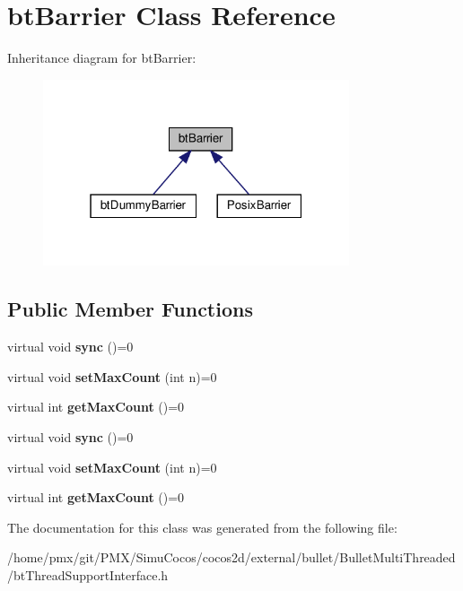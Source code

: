 \hypertarget{classbtBarrier}{}\section{bt\+Barrier Class Reference}
\label{classbtBarrier}


Inheritance diagram for bt\+Barrier\+:
\nopagebreak
\begin{figure}[H]
\begin{center}
\leavevmode
\includegraphics[width=256pt]{classbtBarrier__inherit__graph}
\end{center}
\end{figure}
\subsection*{Public Member Functions}
\begin{DoxyCompactItemize}
\item 
\mbox{\label{classbtBarrier_aaa871504a1b0efe6989efc3240c87564}} 
virtual void {\bfseries sync} ()=0
\item 
\mbox{\label{classbtBarrier_a30f8c5dfa5b1cc41342efcb368defe3a}} 
virtual void {\bfseries set\+Max\+Count} (int n)=0
\item 
\mbox{\label{classbtBarrier_ab34964db1b308486460d32456b719066}} 
virtual int {\bfseries get\+Max\+Count} ()=0
\item 
\mbox{\label{classbtBarrier_aaa871504a1b0efe6989efc3240c87564}} 
virtual void {\bfseries sync} ()=0
\item 
\mbox{\label{classbtBarrier_a30f8c5dfa5b1cc41342efcb368defe3a}} 
virtual void {\bfseries set\+Max\+Count} (int n)=0
\item 
\mbox{\label{classbtBarrier_ab34964db1b308486460d32456b719066}} 
virtual int {\bfseries get\+Max\+Count} ()=0
\end{DoxyCompactItemize}


The documentation for this class was generated from the following file\+:\begin{DoxyCompactItemize}
\item 
/home/pmx/git/\+P\+M\+X/\+Simu\+Cocos/cocos2d/external/bullet/\+Bullet\+Multi\+Threaded/bt\+Thread\+Support\+Interface.\+h\end{DoxyCompactItemize}
